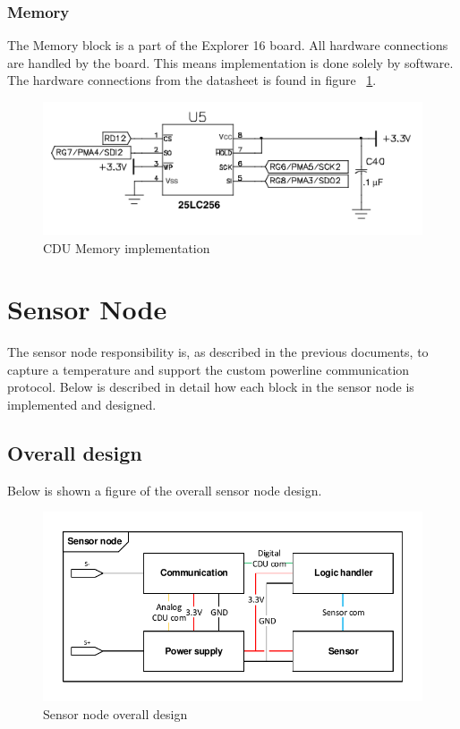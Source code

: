 \subsubsection{Memory}
The Memory block is a part of the Explorer 16 board. All hardware connections are handled by the board. This means implementation is done solely by software. The hardware connections from the datasheet is found in figure ~\ref{fig:CDUimpm}.
\begin{figure}[H]
	\centering
	\includegraphics[scale=0.7]{billeder/impm}
	\caption{CDU Memory implementation}
	\label{fig:CDUimpm}
\end{figure}



\section{Sensor Node}
The sensor node responsibility is, as described in the previous documents, to capture a temperature and support the custom powerline communication protocol. Below is described in detail how each block in the sensor node is implemented and designed.

\subsection{Overall design}
Below is shown a figure of the overall sensor node design.
\begin{figure}[H]
\centering
\includegraphics[width=.9\textwidth]{billeder/sn_overall_design}
\caption{Sensor node overall design}
\end{figure}

